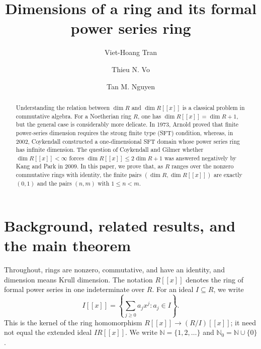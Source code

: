 \documentclass[11pt,reqno]{amsart}
\title[Dimensions of a ring and its power series ring]
  {Dimensions of a ring and its formal power series ring}
\author{Viet-Hoang Tran}
\author{Thieu N. Vo}
\author{Tan M. Nguyen}
\numberwithin{equation}{section}
\theoremstyle{plain}
\theoremstyle{definition}
\theoremstyle{remark}
\newcommand{\N}{\mathbb N}
\begin{document}
\raggedbottom

\begin{abstract}
Understanding the relation between $\dim R$ and $\dim R[[x]]$ is a classical problem in commutative algebra. For a Noetherian ring $R$, one has $\dim R[[x]]=\dim R+1$, but the general case is considerably more delicate. In 1973, Arnold proved that finite power-series dimension requires the strong finite type (SFT) condition, whereas, in 2002, Coykendall constructed a one-dimensional SFT domain whose power series ring has infinite dimension. The question of Coykendall and Gilmer whether $\dim R[[x]]<\infty$ forces $\dim R[[x]]\le2\dim R+1$ was answered negatively by Kang and Park in 2009. In this paper, we prove that, as $R$ ranges over the  nonzero commutative rings with identity, the finite pairs $(\dim R,\dim R[[x]])$ are exactly $(0,1)$ and the pairs $(n,m)$ with $1\le n<m$.
\end{abstract}


\maketitle
\enlargethispage{3pt}

\section{Background, related results, and the main theorem}
\label{sec:introduction}

Throughout, rings are nonzero, commutative, and have an identity,
and dimension means Krull dimension. The notation $R[[x]]$ denotes
the ring of formal power series in one indeterminate over $R$.
For an ideal $I\subseteq R$, we write
\[
 I[[x]]=\left\{\sum_{j\ge0}a_jx^j:a_j\in I\right\}.
\]
This is the kernel of the ring homomorphism $R[[x]]\longrightarrow(R/I)[[x]]$; it need not
equal the extended ideal $IR[[x]]$. We write $\N=\{1,2,\ldots\}$
and $\N_0=\N\cup\{0\}$.
\end{document}
